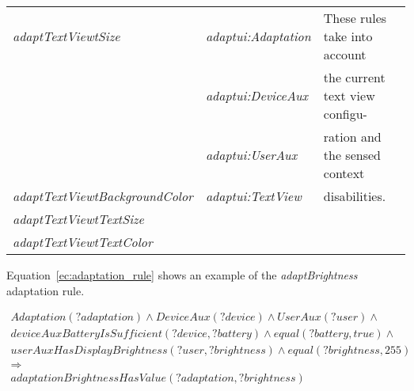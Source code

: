 \begin{table}
\begin{tabular}{l l l}
  \hline 
  \textit{adaptTextViewtSize}	& \textit{adaptui:Adaptation}	& These rules take into account	\\
				& \textit{adaptui:DeviceAux}	& the current text view configu-\\
				& \textit{adaptui:UserAux}	& ration and the sensed	context	\\
  \textit{adaptTextViewtBackgroundColor}& \textit{adaptui:TextView}& disabilities.		\\
  \textit{adaptTextViewtTextSize}&				& 				\\
  \textit{adaptTextViewtTextColor}&				& 				\\
  \hline 
\end{tabular}
\end{table}

Equation~\ref{ec:adaptation_rule} shows an example of the \textit{adaptBrightness} 
adaptation rule.

\footnotesize
\begin{equation} \label{ec:adaptation_rule}
  \begin{align*} 
  Adaptation(?adaptation) ∧ DeviceAux(?device) ∧ UserAux(?user) ∧ \\
  deviceAuxBatteryIsSufficient(?device, ?battery) ∧ equal(?battery, true) ∧ \\
  userAuxHasDisplayBrightness(?user, ?brightness) ∧ equal(?brightness, 255)\\ 
  \Rightarrow \\
  adaptationBrightnessHasValue(?adaptation, ?brightness)\\
  \end{align*}
\end{equation}
\normalsize




